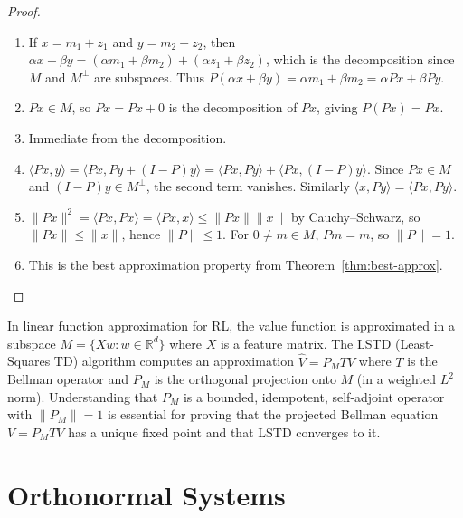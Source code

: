 \documentclass[11pt,a4paper]{article}
\theoremstyle{definition}
\theoremstyle{plain}
\theoremstyle{remark}
\newcommand{\R}{\mathbb{R}}
\begin{document}
\begin{proof}
\begin{enumerate}[label=(\roman*)]
    \item If $x = m_1 + z_1$ and $y = m_2 + z_2$, then
          $\alpha x + \beta y = (\alpha m_1 + \beta m_2) + (\alpha z_1 + \beta z_2)$,
          which is the decomposition since $M$ and $M^\perp$ are subspaces.
          Thus $P(\alpha x + \beta y) = \alpha m_1 + \beta m_2 = \alpha Px + \beta Py$.
    \item $Px \in M$, so $Px = Px + 0$ is the decomposition of $Px$,
          giving $P(Px) = Px$.
    \item Immediate from the decomposition.
    \item $\langle Px, y \rangle = \langle Px, Py + (I - P)y \rangle
          = \langle Px, Py \rangle + \langle Px, (I-P)y \rangle$.
          Since $Px \in M$ and $(I-P)y \in M^\perp$, the second term vanishes.
          Similarly $\langle x, Py \rangle = \langle Px, Py \rangle$.
    \item $\|Px\|^2 = \langle Px, Px \rangle = \langle Px, x \rangle
          \leq \|Px\| \|x\|$ by Cauchy--Schwarz, so $\|Px\| \leq \|x\|$,
          hence $\|P\| \leq 1$. For $0 \neq m \in M$, $Pm = m$, so $\|P\| = 1$.
    \item This is the best approximation property from Theorem~\ref{thm:best-approx}. \qedhere
\end{enumerate}
\end{proof}

\begin{rlconnection}
In linear function approximation for RL, the value function is approximated
in a subspace $M = \{X w : w \in \R^d\}$ where $X$ is a feature matrix.
The LSTD (Least-Squares TD) algorithm computes an approximation
$\hat{V} = P_M T V$ where $T$ is the Bellman operator and $P_M$ is the
orthogonal projection onto $M$ (in a weighted $L^2$ norm). Understanding
that $P_M$ is a bounded, idempotent, self-adjoint operator with
$\|P_M\| = 1$ is essential for proving that the projected Bellman equation
$V = P_M T V$ has a unique fixed point and that LSTD converges to it.
\end{rlconnection}


\section{Orthonormal Systems}\label{sec:orthonormal}
\end{document}

